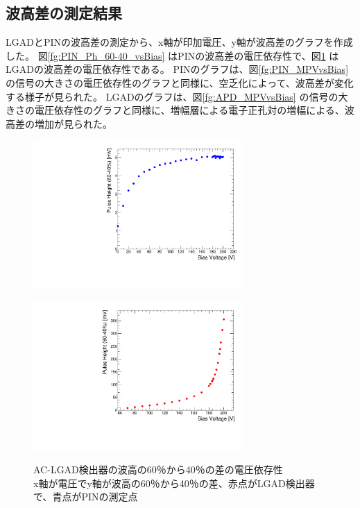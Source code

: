 \subsection{波高差の測定結果}
LGADとPINの波高差の測定から、x軸が印加電圧、y軸が波高差のグラフを作成した。
図\ref{fg:PIN_Ph_60-40_vsBias} はPINの波高差の電圧依存性で、図\ref{fg:APD_Ph_60-40_vsBias} はLGADの波高差の電圧依存性である。
PINのグラフは、図\ref{fg:PIN_MPVvsBias} の信号の大きさの電圧依存性のグラフと同様に、空乏化によって、波高差が変化する様子が見られた。
LGADのグラフは、図\ref{fg:APD_MPVvsBias} の信号の大きさの電圧依存性のグラフと同様に、増幅層による電子正孔対の増幅による、波高差の増加が見られた。

\begin{figure}[h]
    \begin{minipage}[b]{0.5\linewidth}
        \centering
        \includegraphics[width=8cm]{fig/graph/SignalSizevsVoltage_PIN_60-40.pdf}
        \label{fg:PIN_Ph_60-40_vsBias}
    \end{minipage}
    \begin{minipage}[b]{0.5\linewidth}
        \centering
        \includegraphics[width=8cm]{fig/graph/SignalSizevsVoltage_APD_60-40.pdf}
        \label{fg:APD_Ph_60-40_vsBias}
    \end{minipage}
    \caption[AC-LGAD検出器の波高の60％から40％の差の電圧依存性]{AC-LGAD検出器の波高の60％から40％の差の電圧依存性\\x軸が電圧でy軸が波高の60％から40％の差、赤点がLGAD検出器で、青点がPINの測定点}
\end{figure}
